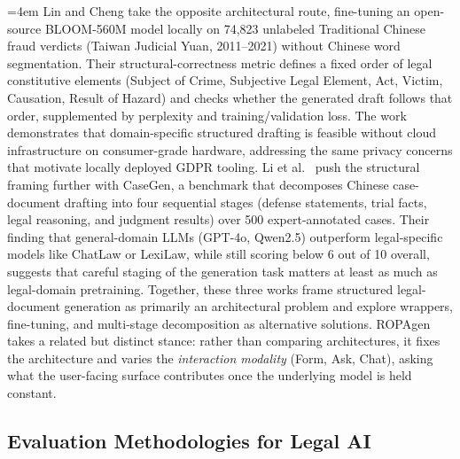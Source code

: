 \begingroup
\sloppy\emergencystretch=4em
Lin and Cheng \cite{linLegalDocumentsDrafting2024} take the opposite architectural route, fine-tuning an open-source BLOOM-560M model locally on 74,823 unlabeled Traditional Chinese fraud verdicts (Taiwan Judicial Yuan, 2011--2021) without Chinese word segmentation. Their structural-correctness metric defines a fixed order of legal constitutive elements (Subject of Crime,\allowbreak{} Subjective Legal Element,\allowbreak{} Act,\allowbreak{} Victim,\allowbreak{} Causation,\allowbreak{} Result of Hazard) and checks whether the generated draft follows that order, supplemented by perplexity and training/validation loss. The work demonstrates that domain-specific structured drafting is feasible without cloud infrastructure on consumer-grade hardware, addressing the same privacy concerns that motivate locally deployed GDPR tooling. Li et al.\ \cite{liCaseGenBenchmarkMultiStage2025} push the structural framing further with CaseGen, a benchmark that decomposes Chinese case-document drafting into four sequential stages (defense statements,\allowbreak{} trial facts,\allowbreak{} legal reasoning,\allowbreak{} and judgment results) over 500 expert-annotated cases. Their finding that general-domain LLMs (GPT-4o, Qwen2.5) outperform legal-specific models like ChatLaw or LexiLaw, while still scoring below 6 out of 10 overall, suggests that careful staging of the generation task matters at least as much as legal-domain pretraining. Together, these three works frame structured legal-document generation as primarily an architectural problem and explore wrappers, fine-tuning, and multi-stage decomposition as alternative solutions. ROPAgen takes a related but distinct stance: rather than comparing architectures, it fixes the architecture and varies the \emph{interaction modality} (Form, Ask, Chat), asking what the user-facing surface contributes once the underlying model is held constant.
\endgroup

\subsection{Evaluation Methodologies for Legal AI}

